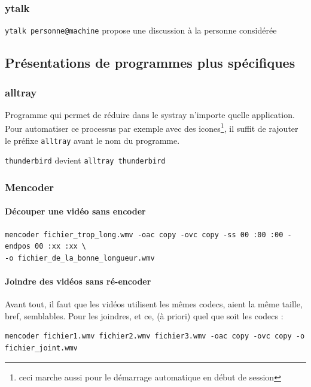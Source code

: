 \documentclass[a4paper,twoside]{article}
\begin{document}
\subsubsection{ytalk}
\verb|ytalk personne@machine| propose une discussion à la personne considérée


\subsection{Présentations de programmes plus spécifiques}
\subsubsection{alltray}
Programme qui permet de réduire dans le systray n'importe quelle application. Pour automatiser ce processus par exemple avec des icones\footnote{ceci marche aussi pour le démarrage automatique en début de session}, il suffit de rajouter le préfixe \verb|alltray| avant le nom du programme.

\begin{exemple}
\texttt{thunderbird} devient \texttt{alltray thunderbird}
\end{exemple}

\subsubsection{Mencoder}
\paragraph{Découper une vidéo sans encoder}
\begin{verbatim}
mencoder fichier_trop_long.wmv -oac copy -ovc copy -ss 00 :00 :00 -endpos 00 :xx :xx \
-o fichier_de_la_bonne_longueur.wmv
\end{verbatim}

\paragraph{Joindre des vidéos sans ré-encoder}
Avant tout, il faut que les vidéos utilisent les mêmes codecs, aient la même taille, bref, semblables.
Pour les joindres, et ce, (à priori) quel que soit les codecs :

\begin{small}\begin{verbatim}
mencoder fichier1.wmv fichier2.wmv fichier3.wmv -oac copy -ovc copy -o fichier_joint.wmv
\end{verbatim}\end{small}
\end{document}
